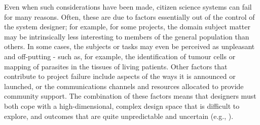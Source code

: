 \documentclass{sigchi}
\begin{document}
Even when such considerations have been made, citizen science systems can fail for many reasons.  Often, these are due to factors essentially out of the control of the system designer; for example, for some projects, the domain subject matter may be intrinsically less interesting to members of the general population than others.  In some cases, the subjects or tasks may even be perceived as unpleasant and off-putting - such as, for example, the identification of tumour cells or mapping of parasites in the tissues of living patients.  Other factors that contribute to project failure include aspects of the ways it is announced or launched, or the communications channels and resources allocated to provide community support.  The combination of these factors means that designers must both cope with a high-dimensional, complex design space that is difficult to explore, and outcomes that are quite unpredictable and uncertain (e.g., \cite{bentham, museums, beamartian}).




\end{document}

